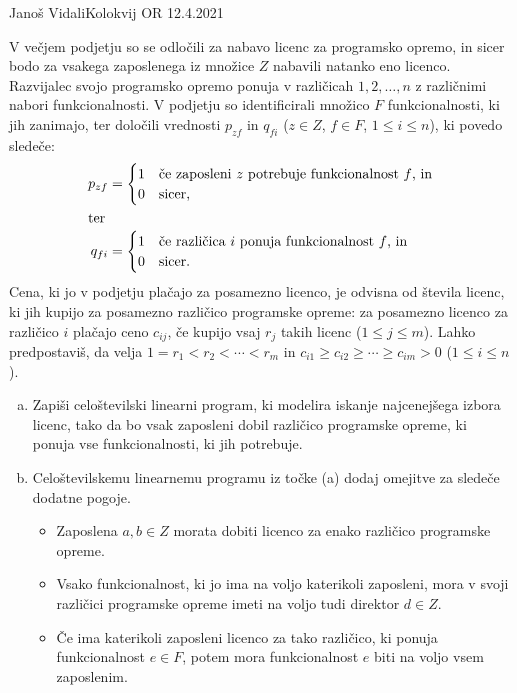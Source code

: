 \begin{naloga}{Janoš Vidali}{Kolokvij OR 12.4.2021}
\begin{vprasanje}
V večjem podjetju so se odločili za nabavo licenc za programsko opremo,
in sicer bodo za vsakega zaposlenega iz množice $Z$ nabavili natanko eno licenco.
Razvijalec svojo programsko opremo ponuja v različicah $1, 2, \dots, n$ z različnimi nabori funkcionalnosti.
V podjetju so identificirali množico $F$ funkcionalnosti, ki jih zanimajo,
ter določili vrednosti $p_{zf}$ in $q_{fi}$
($z \in Z$, $f \in F$, $1 \le i \le n$),
ki povedo sledeče:
\begin{align*}
p_{zf} &= \begin{cases}
1 & \text{če zaposleni $z$ potrebuje funkcionalnost $f$, in} \\
0 & \text{sicer,}
\end{cases} \\
\shortintertext{ter}
q_{fi} &= \begin{cases}
1 & \text{če različica $i$ ponuja funkcionalnost $f$, in} \\
0 & \text{sicer.}
\end{cases}
\end{align*}
Cena, ki jo v podjetju plačajo za posamezno licenco,
je odvisna od števila licenc,
ki jih kupijo za posamezno različico programske opreme:
za posamezno licenco za različico $i$ plačajo ceno $c_{ij}$,
če kupijo vsaj $r_j$ takih licenc ($1 \le j \le m$).
Lahko predpostaviš, da velja $1 = r_1 < r_2 < \cdots < r_m$
in $c_{i1} \ge c_{i2} \ge \cdots \ge c_{im} > 0$ ($1 \le i \le n$).

\begin{enumerate}[(a)]
\item Zapiši celoštevilski linearni program,
ki modelira iskanje najcenejšega izbora licenc,
tako da bo vsak zaposleni dobil različico programske opreme,
ki ponuja vse funkcionalnosti, ki jih potrebuje.

\item Celoštevilskemu linearnemu programu iz točke (a)
dodaj omejitve za sledeče dodatne pogoje.

\begin{itemize}
\item Zaposlena $a, b \in Z$ morata dobiti licenco za enako različico programske opreme.
\item Vsako funkcionalnost, ki jo ima na voljo katerikoli zaposleni,
mora v svoji različici programske opreme imeti na voljo tudi direktor $d \in Z$.
\item Če ima katerikoli zaposleni licenco za tako različico,
ki ponuja funkcionalnost $e \in F$,
potem mora funkcionalnost $e$ biti na voljo vsem zaposlenim.
\end{itemize}
\end{enumerate}
\end{vprasanje}


\end{naloga}
